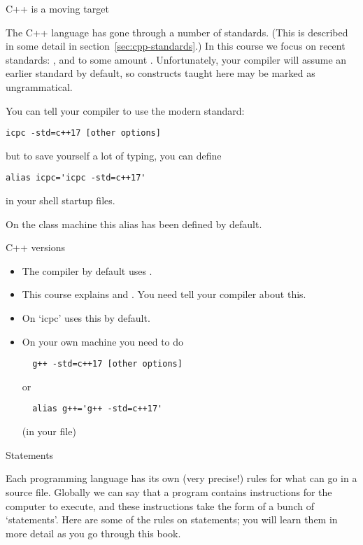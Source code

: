  {C++ is a moving target}

The C++ language has gone through a number of standards. (This is
described in some detail in section~\ref{sec:cpp-standards}.) In this
course we focus on recent standards: 
, and to some amount .
Unfortunately, your compiler will assume an earlier standard by default,
so constructs taught here may be marked as ungrammatical.

You can tell your compiler to use the modern standard:
\begin{verbatim}
icpc -std=c++17 [other options]
\end{verbatim}
but to save yourself a lot of typing, you can define
\begin{verbatim}
alias icpc='icpc -std=c++17'
\end{verbatim}
in your shell startup files.
\begin{tacc}
On the class  machine this alias has been defined by default.
\end{tacc}

\begin{slide}{C++ versions}
  \label{sl:cpp-version}
  \begin{itemize}
  \item
    The compiler by default uses . 
  \item This course explains  and .
    You need tell your compiler about this.
  \item On  `icpc' uses this by default.
  \item On your own machine you need to do
\begin{verbatim}
  g++ -std=c++17 [other options]
\end{verbatim}
or
\begin{verbatim}
  alias g++='g++ -std=c++17'
\end{verbatim}
(in your  file)
  \end{itemize}
\end{slide}

 {Statements}
\label{sec:statements}

Each programming language has its own (very precise!) rules for what
can go in a source file. Globally we can say that a program contains
instructions for the computer to execute, and these instructions take
the form of a bunch of `statements'. Here are some of the rules on
statements; you will learn them in more detail as you go through this
book.

